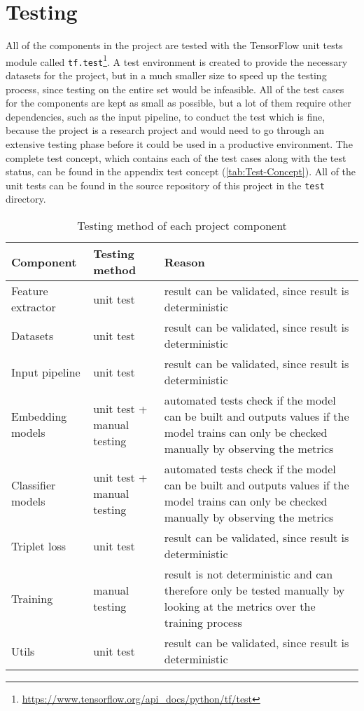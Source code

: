 \section{Testing}
\label{sec:Testing}
All of the components in the project are tested with the TensorFlow unit tests module called \texttt{tf.test}\footnote{\url{https://www.tensorflow.org/api_docs/python/tf/test}}. A test environment is created to provide the necessary datasets for the project, but in a much smaller size to speed up the testing process, since testing on the entire set would be infeasible. All of the test cases for the components are kept as small as possible, but a lot of them require other dependencies, such as the input pipeline, to conduct the test which is fine, because the project is a research project and would need to go through an extensive testing phase before it could be used in a productive environment.
\newline
\newline
The complete test concept, which contains each of the test cases along with the test status, can be found in the appendix test concept (\ref{tab:Test-Concept}). All of the unit tests can be found in the source repository of this project in the \texttt{test} directory.

\begin{table}[htbp]
    \centering
    \caption{Testing method of each project component}
	\label{tab:Components-Testing}
    \begin{tabular}{p{} | p{} | p{}}
        \toprule
        \textbf{Component} & \textbf{Testing method} & \textbf{Reason} \\ 
        \midrule[1pt]
        Feature extractor & unit test & result can be validated, since result is deterministic \\
        \hline
        Datasets & unit test & result can be validated, since result is deterministic \\
        \hline
        Input pipeline & unit test & result can be validated, since result is deterministic \\
        \hline
        Embedding models & unit test + manual testing & automated tests check if the model can be built and outputs values if the model trains can only be checked manually by observing the metrics \\
        \hline
        Classifier models & unit test + manual testing & automated tests check if the model can be built and outputs values if the model trains can only be checked manually by observing the metrics \\
        \hline
        Triplet loss  & unit test & result can be validated, since result is deterministic \\
        \hline
        Training & manual testing & result is not deterministic and can therefore only be tested manually by looking at the metrics over the training process \\
        \hline
        Utils & unit test & result can be validated, since result is deterministic \\
        \bottomrule
    \end{tabular}
\end{table}

